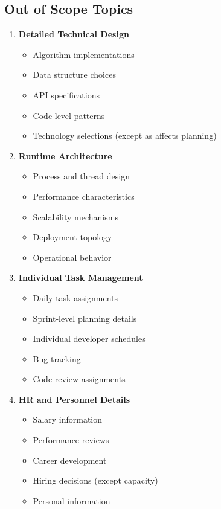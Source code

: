 \documentclass[11pt,letterpaper]{article}
\begin{document}
\subsection{Out of Scope Topics}

\begin{enumerate}[label=\textbf{AC\arabic*:}, leftmargin=2.5em]
    \item \textbf{Detailed Technical Design}
    \begin{itemize}[nosep]
        \item Algorithm implementations
        \item Data structure choices
        \item API specifications
        \item Code-level patterns
        \item Technology selections (except as affects planning)
    \end{itemize}
    
    \item \textbf{Runtime Architecture}
    \begin{itemize}[nosep]
        \item Process and thread design
        \item Performance characteristics
        \item Scalability mechanisms
        \item Deployment topology
        \item Operational behavior
    \end{itemize}
    
    \item \textbf{Individual Task Management}
    \begin{itemize}[nosep]
        \item Daily task assignments
        \item Sprint-level planning details
        \item Individual developer schedules
        \item Bug tracking
        \item Code review assignments
    \end{itemize}
    
    \item \textbf{HR and Personnel Details}
    \begin{itemize}[nosep]
        \item Salary information
        \item Performance reviews
        \item Career development
        \item Hiring decisions (except capacity)
        \item Personal information
    \end{itemize}
    

\end{enumerate}
\end{document}
